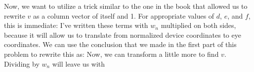 \documentclass[11pt]{tingpset}
\begin{document}
    Now, we want to utilize a trick similar to the one in the book that allowed us to rewrite $v$ as a column vector of itself and 1. For appropriate values of $d$, $e$, and $f$, this is immediate:
    I've written these terms with $w_n$ multiplied on both sides, because it will allow us to translate from normalized device coordinates to eye coordinates. We can use the conclusion that we made in the first part of this problem to rewrite this as:
    Now, we can transform a little more to find $v$. Dividing by $w_n$ will leave us with
\end{document}
